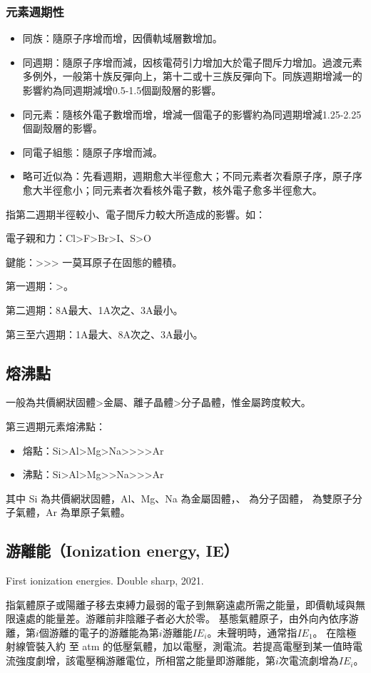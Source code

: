 \documentclass[a4paper,12pt]{report}
\begin{document}
\subsubsection{元素週期性}
\begin{itemize}
\item 同族：隨原子序增而增，因價軌域層數增加。
\item 同週期：隨原子序增而減，因核電荷引力增加大於電子間斥力增加。過渡元素多例外，一般第十族反彈向上，第十二或十三族反彈向下。同族週期增減一的影響約為同週期減增0.5-1.5個副殼層的影響。
\item 同元素：隨核外電子數增而增，增減一個電子的影響約為同週期增減1.25-2.25個副殼層的影響。
\item 同電子組態：隨原子序增而減。
\item 略可近似為：先看週期，週期愈大半徑愈大；不同元素者次看原子序，原子序愈大半徑愈小；同元素者次看核外電子數，核外電子愈多半徑愈大。
\end{itemize}
指第二週期半徑較小、電子間斥力較大所造成的影響。如：
\bit
\item 電子親和力：Cl>F>Br>I、S>O
\item 鍵能：>>>
\eit
{}
一莫耳原子在固態的體積。
\bit
\item 第一週期：>。
\item 第二週期：8A最大、1A次之、3A最小。
\item 第三至六週期：1A最大、8A次之、3A最小。
\eit
\subsection{熔沸點}
一般為共價網狀固體>金屬、離子晶體>分子晶體，惟金屬跨度較大。

第三週期元素熔沸點：
\begin{itemize}
\item 熔點：Si>Al>Mg>Na>>>>Ar
\item 沸點：Si>Al>Mg>>Na>>>Ar
\end{itemize}
其中 Si 為共價網狀固體，Al、Mg、Na 為金屬固體，、 為分子固體， 為雙原子分子氣體，Ar 為單原子氣體。
\subsection{游離能（Ionization energy, IE）}
\bctf{}\caption{First ionization energies. Double sharp, 2021.}\efct
{}
指氣體原子或陽離子移去束縛力最弱的電子到無窮遠處所需之能量，即價軌域與無限遠處的能量差。游離前非陰離子者必大於零。
基態氣體原子，由外向內依序游離，第$i$個游離的電子的游離能為第$i$游離能$IE_i$。未聲明時，通常指$IE_1$。
在陰極射線管裝入約 至 atm 的低壓氣體，加以電壓，測電流。若提高電壓到某一值時電流強度劇增，該電壓稱游離電位，所相當之能量即游離能，第$i$次電流劇增為$IE_i$。
\end{document}
